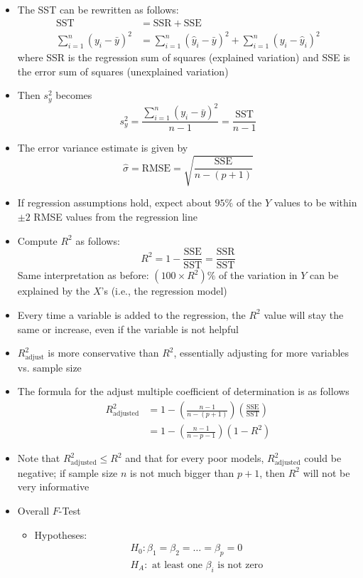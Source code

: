 \documentclass[12pt]{article}
\begin{document}
\begin{itemize}
\item The SST can be rewritten as follows: $$ \begin{aligned} \text{SST} &= \text{SSR} + \text{SSE} \\ \sum_{i=1}^n (y_i - \bar{y})^2 &= \sum_{i=1}^n (\hat{y}_i - \bar{y})^2 + \sum_{i=1}^n (y_i - \hat{y}_i)^2 \end{aligned} $$ where SSR is the regression sum of squares (explained variation) and SSE is the error sum of squares (unexplained variation) 
\item Then $s_y^2$ becomes $$ s_y^2 = \frac{\sum_{i=1}^n (y_i - \bar{y})^2}{n-1} = \frac{\text{SST}}{n-1} $$ 
\item The error variance estimate is given by 
$$ \hat{\sigma} = \text{RMSE} = \sqrt{\frac{\text{SSE}}{n-(p+1)}} $$ 
\item If regression assumptions hold, expect about $95\%$ of the $Y$ values to be within $\pm 2$ RMSE values from the regression line 
\item Compute $R^2$ as follows: $$ R^2 = 1 - \frac{\text{SSE}}{\text{SST}} = \frac{\text{SSR}}{\text{SST}} $$ Same interpretation as before: $(100 \times R^2)\%$ of the variation in $Y$ can be explained by the $X$'s (i.e., the regression model)
\item Every time a variable is added to the regression, the $R^2$ value will stay the same or increase, even if the variable is not helpful 
\item $R^2_{\text{adjust}}$ is more conservative than $R^2$, essentially adjusting for more variables vs. sample size 
\item The formula for the adjust multiple coefficient of determination is as follows $$ \begin{aligned} R^2_{\text{adjusted}} &= 1 - \left(\frac{n-1}{n-(p+1)}\right)\left(\frac{\text{SSE}}{\text{SST}}\right) \\ &= 1- \left(\frac{n-1}{n-p-1}\right)\left(1-R^2\right) \end{aligned} $$ 
\item Note that $R^2_{\text{adjusted}} \leq R^2$ and that for every poor models, $R^2_{\text{adjusted}}$ could be negative; if sample size $n$ is not much bigger than $p+1$, then $R^2$ will not be very informative 
\item Overall $F$-Test \begin{itemize} 
\item Hypotheses: $$ \begin{aligned} H_0: \beta_1 = \beta_2 = \dots = \beta_p = 0 \\ H_A: \text{ at least one } \beta_i \text{ is not zero} \end{aligned} $$ 

\end{itemize}
\end{itemize}
\end{document}

